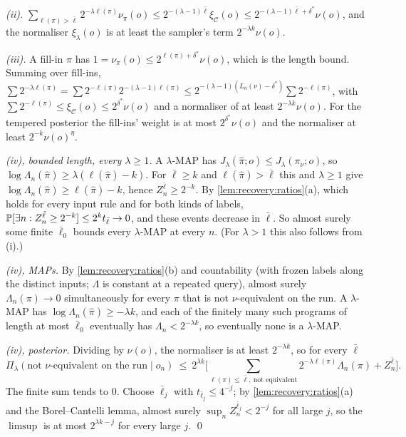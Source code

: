 \emph{(ii).} $\sum_{\ell(\pi)>\bar\ell}2^{-\lambda\ell(\pi)}\nu_\pi(o)\le2^{-(\lambda-1)\bar\ell}\xi_{\mathcal C}(o)\le2^{-(\lambda-1)\bar\ell+\delta^*}\nu(o)$, and the normaliser $\xi_\lambda(o)$ is at least the sampler's term $2^{-\lambda k}\nu(o)$.

\emph{(iii).} A fill-in $\pi$ has $1=\nu_\pi(o)\le2^{\ell(\pi)+\delta^*}\nu(o)$, which is the length bound. Summing over fill-ins, $\sum2^{-\lambda\ell(\pi)}=\sum2^{-\ell(\pi)}2^{-(\lambda-1)\ell(\pi)}\le2^{-(\lambda-1)(L_n(\nu)-\delta^*)}\sum2^{-\ell(\pi)}$, with $\sum2^{-\ell(\pi)}\le\xi_{\mathcal C}(o)\le2^{\delta^*}\nu(o)$ and a normaliser of at least $2^{-\lambda k}\nu(o)$. For the tempered posterior the fill-ins' weight is at most $2^{\delta^*}\nu(o)$ and the normaliser at least $2^{-k}\nu(o)^\eta$.

\emph{(iv), bounded length, every $\lambda\ge1$.} A $\lambda$-MAP has $J_\lambda(\hat\pi;o)\le J_\lambda(\pi_\nu;o)$, so $\log\Lambda_n(\hat\pi)\ge\lambda(\ell(\hat\pi)-k)$. For $\bar\ell\ge k$ and $\ell(\hat\pi)>\bar\ell$ this and $\lambda\ge1$ give $\log\Lambda_n(\hat\pi)\ge\ell(\hat\pi)-k$, hence $Z^{\bar\ell}_n\ge2^{-k}$. By \cref{lem:recovery:ratios}(a), which holds for every input rule and for both kinds of labels, $\mathbb{P}[\exists n:Z^{\bar\ell}_n\ge2^{-k}]\le2^kt_{\bar\ell}\to0$, and these events decrease in $\bar\ell$. So almost surely some finite $\bar\ell_0$ bounds every $\lambda$-MAP at every $n$. (For $\lambda>1$ this also follows from (i).)

\emph{(iv), MAPs.} By \cref{lem:recovery:ratios}(b) and countability (with frozen labels along the distinct inputs; $\Lambda$ is constant at a repeated query), almost surely $\Lambda_n(\pi)\to0$ simultaneously for every $\pi$ that is not $\nu$-equivalent on the run. A $\lambda$-MAP has $\log\Lambda_n(\hat\pi)\ge-\lambda k$, and each of the finitely many such programs of length at most $\bar\ell_0$ eventually has $\Lambda_n<2^{-\lambda k}$, so eventually none is a $\lambda$-MAP.

\emph{(iv), posterior.} Dividing by $\nu(o)$, the normaliser is at least $2^{-\lambda k}$, so for every $\bar\ell$
\[
\Pi_\lambda(\text{not $\nu$-equivalent on the run}\mid o_n)\ \le\ 2^{\lambda k}\Big[\sum_{\ell(\pi)\le\bar\ell,\ \text{not equivalent}}2^{-\lambda\ell(\pi)}\Lambda_n(\pi)+Z^{\bar\ell}_n\Big].
\]
The finite sum tends to $0$. Choose $\bar\ell_j$ with $t_{\bar\ell_j}\le4^{-j}$; by \cref{lem:recovery:ratios}(a) and the Borel--Cantelli lemma, almost surely $\sup_nZ^{\bar\ell_j}_n<2^{-j}$ for all large $j$, so the $\limsup$ is at most $2^{\lambda k-j}$ for every large $j$. \qed
